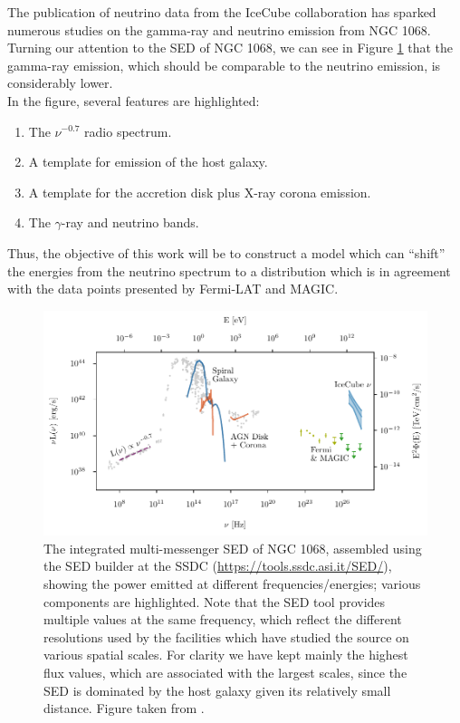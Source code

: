The publication of neutrino data from the IceCube collaboration \citep{IceCube2022} has sparked numerous studies on the gamma-ray and neutrino emission from NGC 1068. Turning our attention to the SED of NGC 1068, we can see in Figure \ref{fig:NGC1068_SED} that the gamma-ray emission, which should be comparable to the neutrino emission, is considerably lower.\\

In the figure, several features are highlighted: 
\begin{enumerate}
    \item The $\nu^{-0.7}$ radio spectrum.
    \item A template for emission of the host galaxy.
    \item A template for the accretion disk plus X-ray corona emission.
    \item The $\gamma$-ray and neutrino bands.
\end{enumerate}

Thus, the objective of this work will be to construct a model which can ``shift'' the energies from the neutrino spectrum to a distribution which is in agreement with the data points presented by Fermi-LAT and MAGIC.

\begin{figure}[H]
    \centering
    \includegraphics[width=\textwidth]{Figures/NGC1068_SED.pdf}
    \caption{The integrated multi-messenger SED of NGC 1068, assembled using the
    SED builder at the SSDC (\url{https://tools.ssdc.asi.it/SED/}), showing the power emitted at different frequencies/energies; various components are highlighted. Note that the SED tool provides multiple values at the same frequency, which reflect the different resolutions used by the facilities which have studied the source on various spatial scales. For clarity we have kept mainly the highest flux values, which are associated with the largest scales, since the SED is dominated by the host galaxy given its relatively small distance. Figure taken from \cite{padovani2024highenergyneutrinosvicinitysupermassive}.}
    \label{fig:NGC1068_SED}
\end{figure}

